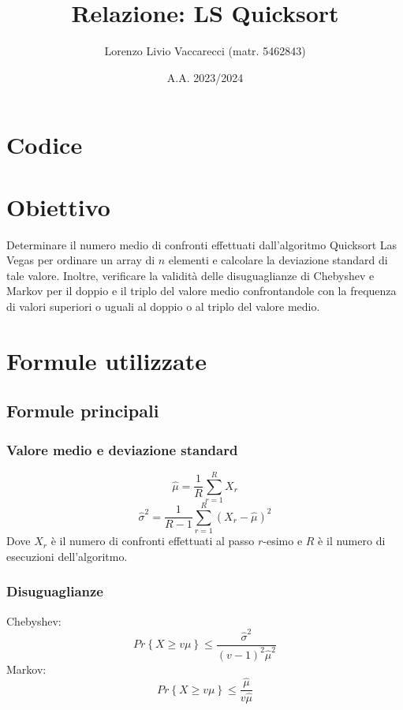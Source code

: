 \documentclass[12pt]{article}
\title{Relazione: LS Quicksort}
\author{Lorenzo Livio Vaccarecci (matr. 5462843)}
\date{A.A. 2023/2024}
\begin{document}
\maketitle
\section{Codice}

\newpage
\section{Obiettivo}
Determinare il numero medio di confronti effettuati 
dall'algoritmo Quicksort Las Vegas per ordinare un array di $n$ 
elementi e calcolare la deviazione standard di tale valore. Inoltre, 
verificare la validità delle disuguaglianze di Chebyshev e Markov per 
il doppio e il triplo del valore medio confrontandole con la frequenza
di valori superiori o uguali al doppio o al triplo del valore medio.
\section{Formule utilizzate}
\subsection{Formule principali}
\subsubsection{Valore medio e deviazione standard}
\begin{equation}
    \hat{\mu} = \frac{1}{R}\sum_{r=1}^{R}X_{r} 
\end{equation}
\begin{equation}
    \hat{\sigma}^{2} = \frac{1}{R-1}\sum_{r=1}^{R}(X_{r}-\hat{\mu})^{2}
\end{equation}
Dove $X_{r}$ è il numero di confronti effettuati al passo $r$-esimo e $R$ 
è il numero di esecuzioni dell'algoritmo.
\subsubsection{Disuguaglianze}
Chebyshev:
\begin{equation}
    Pr\left\{X\geq v\mu\right\}\leq\frac{\hat{\sigma}^{2}}{(v-1)^{2}\hat{\mu}^{2}}
\end{equation}
Markov:
\begin{equation}
    Pr\left\{X\geq v\mu\right\}\leq\frac{\hat{\mu}}{v\hat{\mu}}
\end{equation}
\end{document}
